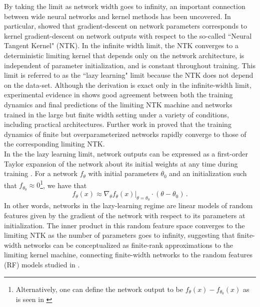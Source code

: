 \documentclass[a4paper, 12pt]{article}
\begin{document}
By taking the limit as network width goes to infinity, an important connection between wide neural networks and kernel methods has been uncovered. In particular, \cite{jacotNeuralTangentKernel2018} showed that gradient-descent on network parameters corresponds to kernel gradient-descent on network outputs with respect to the so-called ``Neural Tangent Kernel" (NTK). In the infinite width limit, the NTK converges to a deterministic limiting kernel that depends only on the network architecture, is independent of parameter initialization, and is constant throughout training. This limit is referred to as the ``lazy learning" limit because the NTK does not depend on the data-set. Although the derivation is exact only in the infinite-width limit, experimental evidence in \cite{jacotNeuralTangentKernel2018} shows good agreement between both the training dynamics and final predictions of the limiting NTK machine and networks trained in the large but finite width setting under a variety of conditions, including practical architectures. Further work in \cite{allen-zhuConvergenceTheoryDeep2019} proved that the training dynamics of finite but overparameterized networks rapidly converge to those of the corresponding limiting NTK.\\

In the the lazy learning limit, network outputs can be expressed as a first-order Taylor expansion of the network about its initial weights at any time during training \cite{leeWideNeuralNetworks2019}. For a network $f_\theta$ with initial parameters $\theta_0$ and an initialization such that $f_{\theta_0} \approx 0$\footnote{Alternatively, one can define the network output to be $f_{\theta}(x) - f_{\theta_0}(x)$ as is seen in \cite{chizatLazyTrainingDifferentiable2020}}, we have that
\begin{equation}
    f_\theta(x) \approx \nabla_\theta \left.f_\theta(x)\right|_{\theta=\theta_0} \cdot (\theta - \theta_0)\,.
\end{equation}
In other words, networks in the lazy-learning regime are linear models of random features given by the gradient of the network with respect to its parameters at initialization. The inner product in this random feature space converges to the limiting NTK as the number of parameters goes to infinity, suggesting that finite-width networks can be conceptualized as finite-rank approximations to the limiting kernel machine, connecting finite-width networks to the random features (RF) models studied in \cite{rahimiRandomFeaturesLargeScale2008,meiGeneralizationErrorRandom2019}.
\end{document}
